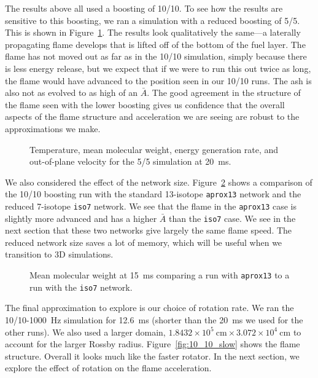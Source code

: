 \documentclass[preprint,times,tighten]{aastex63}
\begin{document}
The results above all used a boosting of 10/10.  To see how the
results are sensitive to this boosting, we ran a simulation with a reduced
boosting of 5/5.  This is shown in Figure~\ref{fig:5_5_overview}.  The
results look qualitatively the same---a laterally propagating flame
develops that is lifted off of the bottom of the fuel layer.  The
flame has not moved out as far as in the 10/10 simulation, simply
because there is less energy release, but we expect that if we were to
run this out twice as long, the flame would have advanced to the
position seen in our 10/10 runs.  The ash is also not as evolved to as high of an $\bar{A}$.  The good agreement in the structure
of the flame seen with the lower boosting gives us confidence that the
overall aspects of the flame structure and acceleration we are seeing
are robust to the approximations we make.

\begin{figure}[t]
\centering
{}
\caption{\label{fig:5_5_overview} Temperature, mean molecular weight, energy generation rate, and out-of-plane velocity for the 5/5 simulation at 20~ms.}
\end{figure}

We also considered the effect of the network size.
Figure~\ref{fig:network} shows a comparison of the 10/10 boosting run
with the standard 13-isotope {\tt aprox13} network and the reduced
7-isotope {\tt iso7} network.  We see that the flame in the {\tt aprox13}
case is slightly more advanced and has a higher $\bar{A}$ than the {\tt iso7}
case.  We see in the next section that these two networks give largely
the same flame speed.  The reduced network size saves a lot of memory,
which will be useful when we transition to 3D simulations.

\begin{figure}[t]
\centering
{}
\caption{\label{fig:network} Mean molecular weight at 15~ms comparing a run with
  {\tt aprox13} to a run with the {\tt iso7} network.}
\end{figure}


The final approximation to explore is our choice of rotation rate.  We ran the 10/10-1000~Hz
simulation for 12.6~ms (shorter than the 20~ms we
used for the other runs).  We also used a larger domain, $1.8432\times
10^5~\mathrm{cm} \times 3.072\times 10^4~\mathrm{cm}$ to account for
the larger Rossby radius.  Figure~\ref{fig:10_10_slow} shows the flame
structure.  Overall it looks much like the faster rotator.  In the
next section, we explore the effect of rotation on the flame
acceleration.
\end{document}
